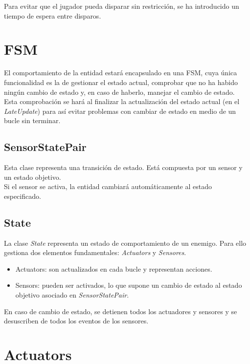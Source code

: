 Para evitar que el jugador pueda disparar sin restricción, se ha introducido un tiempo de espera entre disparos.\\

\section {FSM}

El comportamiento de la entidad estará encapsulado en una FSM, cuya única funcionalidad es la de gestionar el estado actual, comprobar que no ha habido ningún cambio de estado y, en caso de haberlo, manejar el cambio de estado.\\
Esta comprobación se hará al finalizar la actualización del estado actual (en el \textit{LateUpdate}) para así evitar problemas con cambiar de estado en medio de un bucle sin terminar.

\subsection{SensorStatePair}
Esta clase representa una transición de estado. Está compuesta por un sensor y un estado objetivo.\\
Si el sensor se activa, la entidad cambiará automáticamente al estado especificado.\\

\subsection{State}

La clase \textit{State} representa un estado de comportamiento de un enemigo. Para ello gestiona dos elementos fundamentales: \textit{Actuators} y \textit{Sensores}.\\

\begin{itemize}
	 \item Actuators: son actualizados en cada bucle y representan acciones.
	\item Sensors: pueden ser activados, lo que supone un cambio de estado al estado objetivo asociado en \textit{SensorStatePair}.
\end{itemize}
En caso de cambio de estado, se detienen todos los actuadores y sensores y se desuscriben de todos los eventos de los sensores.\\

\section{Actuators}
